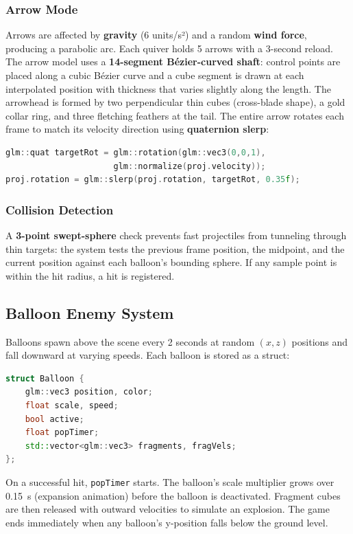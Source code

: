 \documentclass[12pt,a4paper]{article}
\begin{document}
\subsubsection*{Arrow Mode}
Arrows are affected by \textbf{gravity} (6 units/s²) and a random \textbf{wind force}, producing a parabolic arc. Each quiver holds 5 arrows with a 3-second reload. The arrow model uses a \textbf{14-segment Bézier-curved shaft}: control points are placed along a cubic Bézier curve and a cube segment is drawn at each interpolated position with thickness that varies slightly along the length. The arrowhead is formed by two perpendicular thin cubes (cross-blade shape), a gold collar ring, and three fletching feathers at the tail. The entire arrow rotates each frame to match its velocity direction using \textbf{quaternion slerp}:
\begin{lstlisting}[language=C++]
glm::quat targetRot = glm::rotation(glm::vec3(0,0,1),
                      glm::normalize(proj.velocity));
proj.rotation = glm::slerp(proj.rotation, targetRot, 0.35f);
\end{lstlisting}

\subsubsection*{Collision Detection}
A \textbf{3-point swept-sphere} check prevents fast projectiles from tunneling through thin targets: the system tests the previous frame position, the midpoint, and the current position against each balloon's bounding sphere. If any sample point is within the hit radius, a hit is registered.

\subsection{Balloon Enemy System}

Balloons spawn above the scene every 2 seconds at random $(x,z)$ positions and fall downward at varying speeds. Each balloon is stored as a struct:
\begin{lstlisting}[language=C++]
struct Balloon {
    glm::vec3 position, color;
    float scale, speed;
    bool active;
    float popTimer;
    std::vector<glm::vec3> fragments, fragVels;
};
\end{lstlisting}

On a successful hit, \texttt{popTimer} starts. The balloon's scale multiplier grows over 0.15~s (expansion animation) before the balloon is deactivated. Fragment cubes are then released with outward velocities to simulate an explosion. The game ends immediately when any balloon's y-position falls below the ground level.
\end{document}
